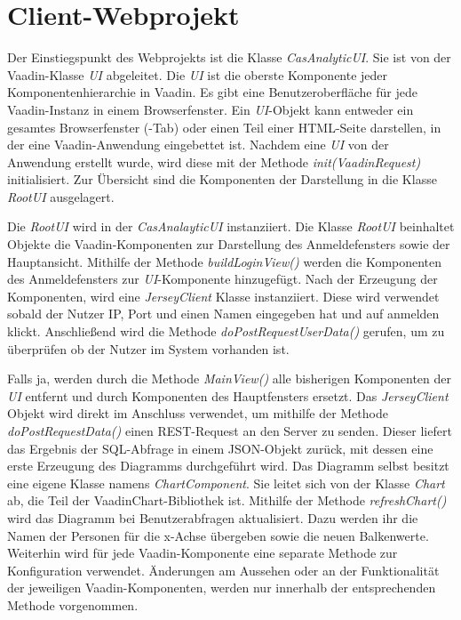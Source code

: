 \section{Client-Webprojekt}
\label{ch:Umsetzung:sec:clientwar}

Der Einstiegspunkt des Webprojekts ist die Klasse \textit{CasAnalyticUI}. Sie ist von der Vaadin-Klasse \textit{UI} abgeleitet. Die \textit{UI} ist die oberste Komponente jeder Komponentenhierarchie in Vaadin. Es gibt eine Benutzeroberfläche für jede Vaadin-Instanz in einem Browserfenster. Ein \textit{UI}-Objekt kann entweder ein gesamtes Browserfenster (-Tab) oder einen Teil einer HTML-Seite darstellen, in der eine Vaadin-Anwendung eingebettet ist. Nachdem eine \textit{UI} von der Anwendung erstellt wurde, wird diese mit der Methode \textit{init(VaadinRequest)} initialisiert. Zur Übersicht sind die Komponenten der Darstellung in die Klasse \textit{RootUI} ausgelagert. 

Die \textit{RootUI} wird in der \textit{CasAnalayticUI} instanziiert. Die Klasse \textit{RootUI} beinhaltet Objekte die Vaadin-Komponenten zur Darstellung des Anmeldefensters sowie der Hauptansicht. Mithilfe der Methode \textit{buildLoginView()} werden die Komponenten des Anmeldefensters zur \textit{UI}-Komponente hinzugefügt. Nach der Erzeugung der Komponenten, wird eine \textit{JerseyClient} Klasse instanziiert. Diese wird verwendet sobald der Nutzer IP, Port und einen Namen eingegeben hat und auf anmelden klickt. Anschließend wird die Methode \textit{doPostRequestUserData()} gerufen, um zu überprüfen ob der Nutzer im System vorhanden ist. 

Falls ja, werden durch die Methode \textit{MainView()} alle bisherigen Komponenten der \textit{UI} entfernt und durch Komponenten des Hauptfensters ersetzt. Das \textit{JerseyClient} Objekt wird direkt im Anschluss verwendet, um mithilfe der Methode \textit{doPostRequestData()} einen REST-Request an den Server zu senden. Dieser liefert das Ergebnis der SQL-Abfrage in einem JSON-Objekt zurück, mit dessen eine erste Erzeugung des Diagramms durchgeführt wird. Das Diagramm selbst besitzt eine eigene Klasse namens \textit{ChartComponent}. Sie leitet sich von der Klasse \textit{Chart} ab, die Teil der VaadinChart-Bibliothek ist. Mithilfe der Methode \textit{refreshChart()} wird das Diagramm bei Benutzerabfragen aktualisiert. Dazu werden ihr die Namen der Personen für die x-Achse übergeben sowie die neuen Balkenwerte. Weiterhin wird für jede Vaadin-Komponente eine separate Methode zur Konfiguration verwendet. Änderungen am Aussehen oder an der Funktionalität der jeweiligen Vaadin-Komponenten, werden nur innerhalb der entsprechenden Methode vorgenommen.

